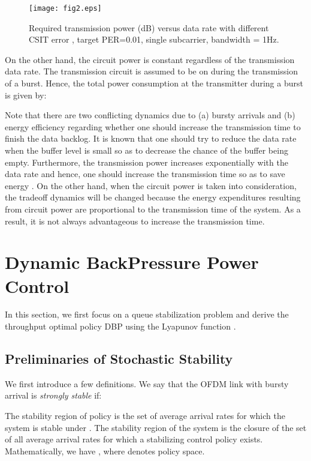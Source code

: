 \documentclass[11pt,journal, onecolumn]{./IEEEtran}
\newcommand{\red}{\color{black}}
\begin{document}
\begin{figure}[t!]
\centering
\texttt{[image: fig2.eps]}
\caption{Required transmission power (dB) versus data rate with different CSIT error , target PER=0.01, single subcarrier, bandwidth = 1Hz.} \label{fig2}
\end{figure}

On the other hand, the circuit power  is constant regardless of the transmission data rate. The transmission circuit is assumed to be on during the transmission of a burst. Hence, the total power consumption at the transmitter during a burst is given by:


Note that there are two conflicting dynamics due to (a) bursty arrivals and (b) energy efficiency regarding whether one should increase the transmission time to finish the data backlog. It is known \cite{berry_communication_2002} that one should try to reduce the data rate when the buffer level is small so as to decrease the chance of the buffer being empty.
Furthermore, the transmission power increases exponentially with the data rate and hence, one should increase the transmission time so as to save energy \cite{zafer_minimum_2009}. On the other hand, when the circuit power is taken into consideration, the tradeoff dynamics will be changed because the energy expenditures resulting from circuit power are proportional to the transmission time of the system\cite{shuguang_cui_energy-constrained_2005}. As a result, it is not always advantageous to increase the transmission time.




\section{Dynamic BackPressure Power Control}

In this section, we first focus on a queue stabilization problem and derive the throughput optimal policy DBP using the {\red Lyapunov function  \cite{andrews_scheduling_2004}}.

\subsection{Preliminaries of Stochastic Stability}
We first introduce a few definitions. We say that the OFDM link with bursty arrival is \emph{strongly stable} if: 

\begin{Definition} The stability region  of policy  is the set of average arrival rates  for which the system is stable under . The stability region of the system  is the closure of the set of all average arrival rates  for which a stabilizing control policy exists. Mathematically, we have , where  denotes policy space. ~\hfill\IEEEQED
\end{Definition}
\end{document}
